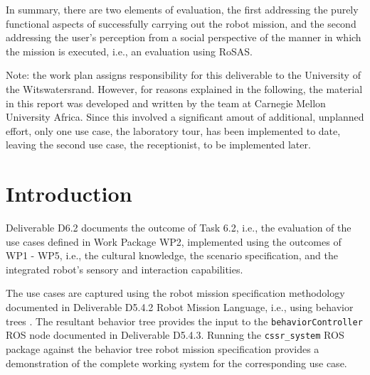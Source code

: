 \documentclass{CSSRforAfrica}
\begin{document}
In summary, there are two elements of evaluation, the first addressing the purely functional aspects of successfully carrying out the robot mission, and the second addressing the user's perception from a social perspective of the manner in which the mission is executed, i.e., an evaluation using RoSAS.

Note: the work plan assigns responsibility for this deliverable to the University of the Witswatersrand. However, for reasons explained in the following, the material in this report was developed and written by the team at Carnegie Mellon University Africa. Since this involved a significant amout of additional, unplanned effort, only one use case, the laboratory tour, has been implemented to date, leaving the second use case, the receptionist, to be implemented later. 
  
\pagebreak
\tableofcontents
\newpage


\section{Introduction}
 \label{section:introduction}

  
Deliverable D6.2 documents the outcome of Task 6.2, i.e., the  evaluation of the  use cases defined in Work Package WP2, implemented using the outcomes of WP1 - WP5, i.e., the cultural knowledge, the scenario specification, and the integrated  robot's sensory and interaction capabilities. 

The use cases are captured using the robot mission specification methodology documented in Deliverable D5.4.2 Robot Mission Language, i.e., using behavior trees \cite{Ghzoulietal2023,DortmansPunter2022}. The resultant behavior tree provides the input to the {\small \tt behaviorController} ROS node documented in Deliverable D5.4.3.  Running the {\small \tt cssr\_system} ROS package against the behavior tree robot mission specification provides a demonstration of the complete working system for the corresponding  use case. 
\end{document}
